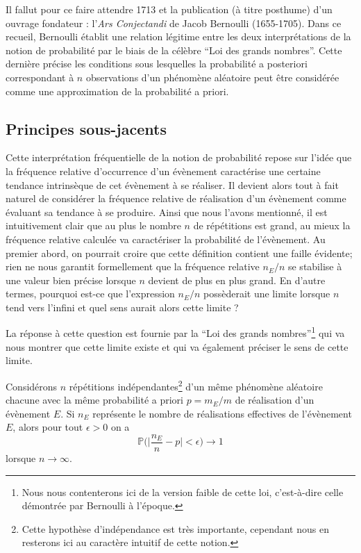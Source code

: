 \documentclass[11pt,a4paper]{article}
\begin{document}
Il fallut pour ce faire attendre 1713 et la publication (à titre posthume) d'un ouvrage fondateur : l'\textit{Ars Conjectandi} de Jacob Bernoulli (1655-1705). Dans ce recueil, Bernoulli établit une relation légitime entre les deux interprétations de la notion de probabilité par le biais de la célèbre ``Loi des grands nombres''. Cette dernière précise les conditions sous lesquelles la probabilité a posteriori correspondant à $n$ observations d'un phénomène aléatoire peut être considérée comme une approximation de la probabilité a priori.

\subsection{Principes sous-jacents}

Cette interprétation fréquentielle de la notion de probabilité repose sur l'idée que la fréquence relative d'occurrence d'un évènement caractérise une certaine tendance intrinsèque de cet évènement à se réaliser. Il devient alors tout à fait naturel de considérer la fréquence relative de réalisation d'un évènement comme évaluant sa tendance à se produire. Ainsi que nous l'avons mentionné, il est intuitivement clair que au plus le nombre $n$ de répétitions est grand, au mieux la fréquence relative calculée va caractériser la probabilité de l'évènement. Au premier abord, on pourrait croire que cette définition contient une faille évidente; rien ne nous garantit formellement que la fréquence relative $n_E/n$ se stabilise à une valeur bien précise lorsque $n$ devient de plus en plus grand. En d'autre termes, pourquoi est-ce que l'expression $n_E/n$ possèderait une limite lorsque $n$ tend vers l'infini et quel sens aurait alors cette limite ?

La réponse à cette question est fournie par la ``Loi des grands nombres''\footnote{Nous nous contenterons ici de la version faible de cette loi, c'est-à-dire celle démontrée par Bernoulli à l'époque.} qui va nous montrer que cette limite existe et qui va également préciser le sens de cette limite.

\begin{The}{Considérons $n$ répétitions indépendantes\footnote{Cette hypothèse d'indépendance est très importante, cependant nous en resterons ici au caractère intuitif de cette notion.} d'un même phénomène aléatoire chacune avec la même probabilité a priori $p = m_E/m$ de réalisation d'un évènement $E$. Si $n_E$ représente le nombre de réalisations effectives de l'évènement $E$, alors pour tout $\epsilon>0$ on a
\[\mathbb{P}\Biggl(\Biggl|\frac{n_E}{n} - p\Biggr|<\epsilon\Biggr)\rightarrow 1\]
lorsque $n\rightarrow\infty$.}
\end{The}
\end{document}

